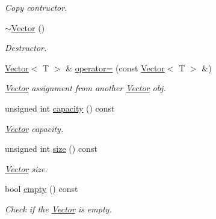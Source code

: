 \begin{DoxyCompactItemize}
\begin{DoxyCompactList}\small\item\em Copy contructor. \end{DoxyCompactList}\item 
\mbox{\label{class_vector_afd524fac19e6d3d69db5198ffe2952b0}} 
\hyperlink{class_vector_afd524fac19e6d3d69db5198ffe2952b0}{$\sim$\+Vector} ()
\begin{DoxyCompactList}\small\item\em Destructor. \end{DoxyCompactList}\item 
\mbox{\label{class_vector_a84e014345158da7a6b89a4879c8086c4}} 
\hyperlink{class_vector}{Vector}$<$ T $>$ \& \hyperlink{class_vector_a84e014345158da7a6b89a4879c8086c4}{operator=} (const \hyperlink{class_vector}{Vector}$<$ T $>$ \&)
\begin{DoxyCompactList}\small\item\em \hyperlink{class_vector}{Vector} assignment from another \hyperlink{class_vector}{Vector} obj. \end{DoxyCompactList}\item 
\mbox{\label{class_vector_a68ecb8dc5e1047cead715396d146ed61}} 
unsigned int \hyperlink{class_vector_a68ecb8dc5e1047cead715396d146ed61}{capacity} () const
\begin{DoxyCompactList}\small\item\em \hyperlink{class_vector}{Vector} capacity. \end{DoxyCompactList}\item 
\mbox{\label{class_vector_a5214a382564aedc712b609416aa3b7b1}} 
unsigned int \hyperlink{class_vector_a5214a382564aedc712b609416aa3b7b1}{size} () const
\begin{DoxyCompactList}\small\item\em \hyperlink{class_vector}{Vector} size. \end{DoxyCompactList}\item 
\mbox{\label{class_vector_ad688a8a0dfbd07ea63d838058a436f79}} 
bool \hyperlink{class_vector_ad688a8a0dfbd07ea63d838058a436f79}{empty} () const
\begin{DoxyCompactList}\small\item\em Check if the \hyperlink{class_vector}{Vector} is empty. \end{DoxyCompactList}\item 

\end{DoxyCompactItemize}

